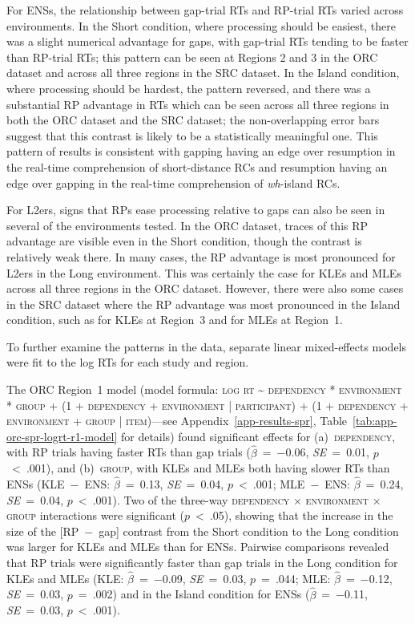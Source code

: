 For ENSs, the relationship between gap-trial RTs and RP-trial RTs varied across environments. In the Short condition, where processing should be easiest, there was a slight numerical advantage for gaps, with gap-trial RTs tending to be faster than RP-trial RTs; this pattern can be seen at Regions 2 and 3 in the ORC dataset and across all three regions in the SRC dataset. In the Island condition, where processing should be hardest, the pattern reversed, and there was a substantial RP advantage in RTs which can be seen across all three regions in both the ORC dataset and the SRC dataset; the non-overlapping error bars suggest that this contrast is likely to be a statistically meaningful one. This pattern of results is consistent with gapping having an edge over resumption in the real-time comprehension of short-distance RCs and resumption having an edge over gapping in the real-time comprehension of \textit{wh}-island RCs.

For L2ers, signs that RPs ease processing relative to gaps can also be seen in several of the environments tested. In the ORC dataset, traces of this RP advantage are visible even in the Short condition, though the contrast is relatively weak there. In many cases, the RP advantage is most pronounced for L2ers in the Long environment. This was certainly the case for KLEs and MLEs across all three regions in the ORC dataset. However, there were also some cases in the SRC dataset where the RP advantage was most pronounced in the Island condition, such as for KLEs at Region~3 and for MLEs at Region~1.

To further examine the patterns in the data, separate linear mixed-effects models were fit to the log RTs for each study and region. 

The ORC Region~1 model (model formula: \textsc{log rt \~{} dependency * environment * group + (1 + dependency + environment | participant) + (1 + dependency + environment + group | item)}---see Appendix~\ref{app-results-spr}, Table~\ref{tab:app-orc-spr-logrt-r1-model} for details) found significant effects for (a)~\textsc{dependency}, with RP trials having faster RTs than gap trials ($\hat{\beta}$~=~−0.06, \textit{SE}~=~0.01, $p$~<~.001), and (b)~\textsc{group}, with KLEs and MLEs both having slower RTs than ENSs (KLE~−~ENS: $\hat{\beta}$~=~0.13, \textit{SE}~=~0.04, $p$~<~.001; MLE~−~ENS: $\hat{\beta}$~=~0.24, \textit{SE}~=~0.04, $p$~<~.001). Two of the three-way \textsc{dependency} × \textsc{environment} × \textsc{group} interactions were significant ($p$~<~.05), showing that the increase in the size of the [RP~−~gap] contrast from the Short condition to the Long condition was larger for KLEs and MLEs than for ENSs. Pairwise comparisons revealed that RP trials were significantly faster than gap trials in the Long condition for KLEs and MLEs (KLE: $\hat{\beta}$~=~−0.09, \textit{SE}~=~0.03, $p$~=~.044; MLE: $\hat{\beta}$~=~−0.12, \textit{SE}~=~0.03, $p$~=~.002) and in the Island condition for ENSs ($\hat{\beta}$~=~−0.11, \textit{SE}~=~0.03, $p$~<~.001). 


